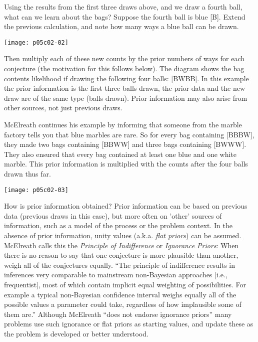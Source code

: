 Using the results from the first three draws above, and we draw a fourth ball, what can we learn about the bags?  Suppose the fourth ball is blue [B].  Extend the previous calculation, and note how many ways a blue ball can be drawn.
\begin{marginfigure}
\texttt{[image: p05c02-02]}
\end{marginfigure}
Then multiply each of these new counts by the prior numbers of ways for each conjecture (the motivation for this follows below).  The diagram shows the bag contents likelihood if  drawing the following four balls:  [BWBB].
In this example the prior information is the first three balls drawn, the prior data and the new draw are of the same type (balls drawn).  Prior information may also arise from other sources, not just previous draws.

McElreath \cite{McElreath2015} continues his example by informing that 
someone from the marble factory tells you that blue marbles are rare. So for every bag containing [BBBW], they made two bags containing [BBWW] and three bags containing [BWWW]. They also ensured that every bag contained at least one blue and one white marble.
This prior information is multiplied with the counts after the four balls drawn thus far.
\begin{marginfigure}
\texttt{[image: p05c02-03]}
\end{marginfigure}

How is prior information obtained?  Prior information can be based on previous data (previous draws in this case), but more often on 'other' sources of information, such as a model of the process or the problem context. In the absence of prior information, unity values (a.k.a. \textit{flat priors}) can be assumed.  McElreath  calls this the \textit{Principle of Indifference} or \textit{Ignorance Priors}: When there is no reason to say that one conjecture is more plausible than another, weigh all of the conjectures equally. ``The principle of indifference results in inferences very comparable to mainstream non-Bayesian approaches [i.e., frequentist], most of which contain implicit equal weighting of possibilities. For example a typical non-Bayesian confidence interval weighs equally all of the possible values a parameter could take, regardless of how implausible some of them are.''\cite{McElreath2015}  Although McElreath ``does not endorse ignorance priors'' many problems use such ignorance or flat priors as starting values, and update these as the problem is developed or better understood.


